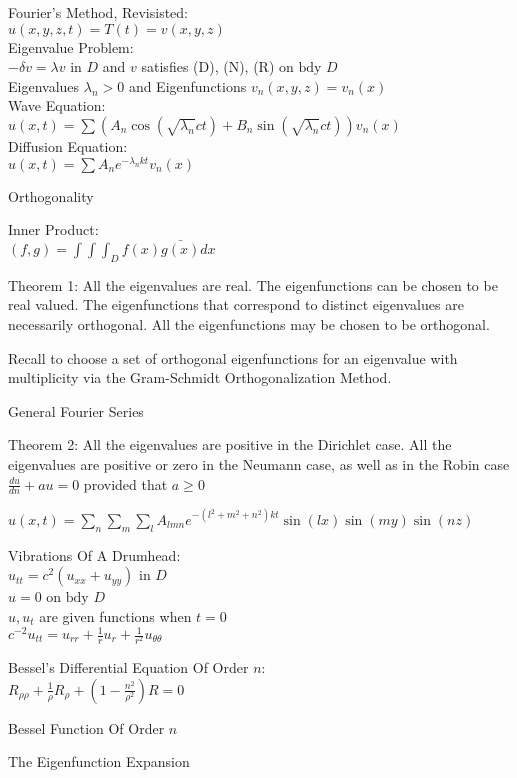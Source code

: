 Fourier's Method, Revisisted: \\
$u(x,y,z,t)=T(t)=v(x,y,z)$ \\
Eigenvalue Problem: \\
$- \delta v = \lambda v$ in $D$ and $v$ satisfies (D), (N), (R) on $\text{bdy }D$ \\
Eigenvalues $\lambda_n > 0$ and Eigenfunctions $v_n(x,y,z)=v_n(x)$ \\
Wave Equation: \\
$u(x,t)=\sum (A_n \cos(\sqrt{\lambda_n}ct) + B_n \sin (\sqrt{\lambda_n}ct))v_n (x)$ \\
Diffusion Equation: \\
$u(x,t)=\sum A_n e^{-\lambda_n kt}v_n (x)$

Orthogonality

Inner Product: \\
$(f,g)=\int \int \int_D f(x) \bar{g(x)} dx$

Theorem 1: All the eigenvalues are real. The eigenfunctions can be chosen to be real valued. The eigenfunctions that correspond to distinct eigenvalues are necessarily orthogonal. All the eigenfunctions may be chosen to be orthogonal.

Recall to choose a set of orthogonal eigenfunctions for an eigenvalue with multiplicity via the Gram-Schmidt Orthogonalization Method.

General Fourier Series

Theorem 2: All the eigenvalues are positive in the Dirichlet case. All the eigenvalues are positive or zero in the Neumann case, as well as in the Robin case $\frac{du}{dn} + au = 0$ provided that $a \ge 0$

$u(x,t)=\sum_n \sum_m \sum_l A_{lmn} e^{-(l^2+m^2+n^2)kt} \sin(lx) \sin(my) \sin(nz)$

Vibrations Of A Drumhead: \\
$u_{tt}=c^2(u_{xx}+u_{yy})$ in $D$ \\
$u=0$ on $\text{bdy }D$ \\
$u,u_t$ are given functions when $t=0$ \\
$c^{-2}u_{tt}=u_{rr}+\frac{1}{r}u_r+\frac{1}{r^2}u_{\theta \theta}$

Bessel's Differential Equation Of Order $n$: \\
$R_{\rho \rho} + \frac{1}{\rho} R_{\rho} + \left(1-\frac{n^2}{\rho^2} \right)R=0$

Bessel Function Of Order $n$

The Eigenfunction Expansion

